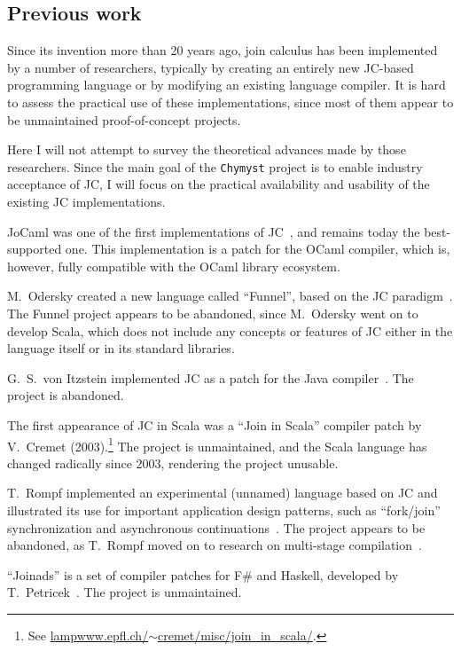 \documentclass[sigplan,10pt]{acmart}\settopmatter{}
\begin{document}
\subsection{Previous work}

Since its invention more than 20 years ago, join calculus has been
implemented by a number of researchers, typically by creating an entirely
new JC-based programming language or by modifying an existing language
compiler. It is hard to assess the practical use of these
implementations, since most of them appear to be unmaintained proof-of-concept
projects. 

Here I will not attempt to survey the theoretical advances made by
those researchers. Since the main goal of the \texttt{Chymyst} project
is to enable industry acceptance of JC, I will focus on the practical
availability and usability of the existing JC implementations.

JoCaml was one of the first implementations of JC~\citep{FouEA2003},
and remains today the best-supported one. This implementation is a
patch for the OCaml compiler, which is, however, fully compatible
with the OCaml library ecosystem. 

M.~Odersky created a new language called ``Funnel'', based on the
JC paradigm~\citep{Ode2000}. The Funnel project appears to be abandoned,
since M.~Odersky went on to develop Scala, which does not include
any concepts or features of JC \textemdash{} either in the language
itself or in its standard libraries.

G.~S.~von Itzstein implemented JC as a patch for the Java compiler~\citep{Von2004}.
The project is abandoned.

The first appearance of JC in Scala was a \textquotedblleft Join in
Scala\textquotedblright{} compiler patch by V.~Cremet (2003).\footnote{ See \href{http://lampwww.epfl.ch/~cremet/misc/join_in_scala/index.html}{lampwww.epfl.ch/$\sim$cremet/misc/join\_{}in\_{}scala/}.}
The project is unmaintained, and the Scala language has changed radically
since 2003, rendering the project unusable.

T.~Rompf implemented an experimental (unnamed) language based on
JC and illustrated its use for important application design patterns,
such as ``fork/join'' synchronization and asynchronous continuations~\citep{Rom2007}.
The project appears to be abandoned, as T.~Rompf moved on to research
on multi-stage compilation~\citep{Rom2012}.

``Joinads'' is a set of compiler patches for F\# and Haskell, developed
by T.~Petricek~\citep{PetSym2011}. The project is unmaintained.
\end{document}
